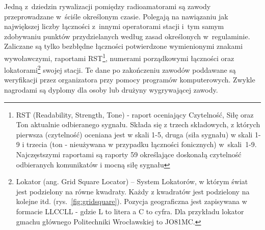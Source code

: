 \documentclass[]{mgr}
\begin{document}
                Jedną z~dziedzin rywalizacji pomiędzy radioamatorami są zawody przeprowadzane w~ściśle określonym czasie. Polegają na nawiązaniu jak największej liczby łączności z~innymi operatorami stacji i~tym samym zdobywaniu punktów przydzielanych według zasad określonych w~regulaminie. Zaliczane są tylko bezbłędne łączności potwierdzone wymienionymi znakami wywoławczymi, raportami RST\footnote{RST (Readability, Strength, Tone) - raport oceniający Czytelność, Siłę oraz Ton aktualnie odbieranego sygnału. Składa się z trzech składowych, z których pierwsza (czytelność) oceniana jest w skali 1-5, druga (siła sygnału) w skali 1-9 i trzecia (ton - nieużywana w przypadku łączności fonicznych) w~\mbox{skali~1-9}. Najczęstszymi raportami są raporty 59 określające doskonałą czytelność odbieranych komunikatów i mocną siłę sygnału}, numerami porządkowymi łączności oraz lokatorami\footnote{Lokator (ang. Grid Square Locator) – System Lokatorów, w którym świat jest podzielony na równe kwadraty. Każdy z kwadratów jest podzielony na kolejne itd. (rys.~\ref{fig:gridsquare}). Pozycja geograficzna jest zapisywana w formacie LLCCLL - gdzie L to litera a C to cyfra. Dla przykładu lokator gmachu głównego Politechniki Wrocławskiej to JO81MC.} swojej stacji. Te dane po zakończeniu zawodów poddawane są weryfikacji przez organizatora przy pomocy programów komputerowych. Zwykle nagrodami są dyplomy dla osoby lub drużyny wygrywającej zawody.
\end{document}
